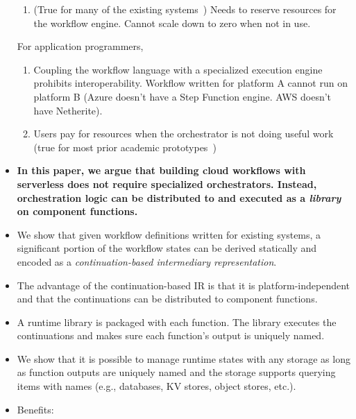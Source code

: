 \begin{itemize}
\begin{enumerate}
    \item (True for many of the existing systems~\cite{gg-atc,excamera, kappa,
    pywren}) Needs to reserve resources for the workflow engine. Cannot scale
    down to zero when not in use.
  \end{enumerate}

  For application programmers,

  \begin{enumerate}
    \item Coupling the workflow language with a specialized execution engine
    prohibits interoperability. Workflow written for platform A cannot run on
    platform B (Azure doesn't have a Step Function engine. AWS doesn't have
    Netherite).

    \item Users pay for resources when the orchestrator is not doing useful
    work (true for most prior academic prototypes~\cite{gg-atc, excamera,
    kappa, triggerflow, pywren})
  \end{enumerate}


  \item \textbf{In this paper, we argue that building cloud workflows with serverless
does not require specialized orchestrators. Instead, orchestration logic can
be distributed to and executed as a \emph{library} on component functions.}

  \item We show that given workflow definitions written for existing systems,
  a significant portion of the workflow states can be derived statically and
  encoded as a \emph{continuation-based intermediary representation}.

  \item The advantage of the continuation-based IR is that it is
  platform-independent and that the continuations can be distributed to
  component functions.

  \item A runtime library is packaged with each function. The library executes
  the continuations and makes sure each function's output is uniquely named.

  \item We show that it is possible to manage runtime states with any storage
  as long as function outputs are uniquely named and the storage supports
  querying items with names (e.g., databases, KV stores, object stores, etc.).

  \item Benefits:


\end{itemize}
